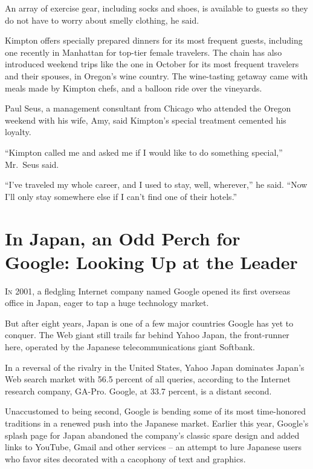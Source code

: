 ﻿\documentclass[12pt]{article}
\begin{document}
An array of exercise gear, including socks and shoes, is available to guests so they do not have to
worry about smelly clothing, he said.

Kimpton offers specially prepared dinners for its most frequent guests, including one recently in
Manhattan for top-tier female travelers. The chain has also introduced weekend trips like the one in
October for its most frequent travelers and their spouses, in Oregon's wine country. The
wine-tasting getaway came with meals made by Kimpton chefs, and a balloon ride over the vineyards.

Paul Seus, a management consultant from Chicago who attended the Oregon weekend with his wife, Amy,
said Kimpton's special treatment cemented his loyalty.

``Kimpton called me and asked me if I would like to do something special,'' Mr.~Seus said.

``I've traveled my whole career, and I used to stay, well, wherever,'' he said. ``Now I'll only stay
somewhere else if I can't find one of their hotels.''

\section{In Japan, an Odd Perch\cite{perch} for Google: Looking Up at the Leader}

\lettrine{I}{n} 2001, a fledgling\cite{fledgling} Internet company named
Google opened its first overseas office in Japan, eager to tap a huge technology market.

But after eight years, Japan is one of a few major countries Google has yet to conquer. The Web
giant still trails far behind Yahoo Japan, the front-runner here, operated by the Japanese
telecommunications giant Softbank.

In a reversal of the rivalry in the United States, Yahoo Japan dominates Japan's Web search market
with 56.5 percent of all queries, according to the Internet research company, GA-Pro. Google, at
33.7 percent, is a distant second.

Unaccustomed to being second, Google is bending some of its most time-honored traditions in a
renewed push into the Japanese market. Earlier this year, Google's splash page for Japan abandoned
the company's classic spare design and added links to YouTube, Gmail and other services -- an
attempt to lure Japanese users who favor sites decorated with a cacophony of text and graphics.
\end{document}
